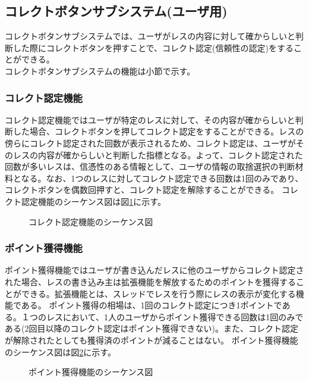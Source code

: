 \documentclass[a4j]{jarticle}
\begin{document}
  \subsection{コレクトボタンサブシステム(ユーザ用)}
  コレクトボタンサブシステムでは、ユーザがレスの内容に対して確からしいと判断した際にコレクトボタンを押すことで、コレクト認定(信頼性の認定)をすることができる。\\
  コレクトボタンサブシステムの機能は小節で示す。
  \subsubsection{コレクト認定機能}
  コレクト認定機能ではユーザが特定のレスに対して、その内容が確からしいと判断した場合、コレクトボタンを押してコレクト認定をすることができる。レスの傍らにコレクト認定された回数が表示されるため、コレクト認定は、ユーザがそのレスの内容が確からしいと判断した指標となる。よって、コレクト認定された回数が多いレスは、信憑性のある情報として、ユーザの情報の取捨選択の判断材料となる。なお、1つのレスに対してコレクト認定できる回数は1回のみであり、コレクトボタンを偶数回押すと、コレクト認定を解除することができる。
  コレクト認定機能のシーケンス図は図\ref{fig:correct_correct.png}に示す。

  \begin{figure}[H]
    \centering
    \caption{コレクト認定機能のシーケンス図}
    \label{fig:correct_correct.png}
  \end{figure}



  \subsubsection{ポイント獲得機能}
  ポイント獲得機能ではユーザが書き込んだレスに他のユーザからコレクト認定された場合、レスの書き込み主は拡張機能を解放するためのポイントを獲得することができる。拡張機能とは、スレッドでレスを行う際にレスの表示が変化する機能である。
  ポイント獲得の相場は、1回のコレクト認定につき1ポイントである。１つのレスにおいて、1人のユーザからポイント獲得できる回数は1回のみである(2回目以降のコレクト認定はポイント獲得できない)。また、コレクト認定が解除されたとしても獲得済のポイントが減ることはない。
  ポイント獲得機能のシーケンス図は図\ref{fig:correct_point.png}に示す。

  \begin{figure}[H]
    \centering
    \caption{ポイント獲得機能のシーケンス図}
    \label{fig:correct_point.png}
  \end{figure}
\end{document}
